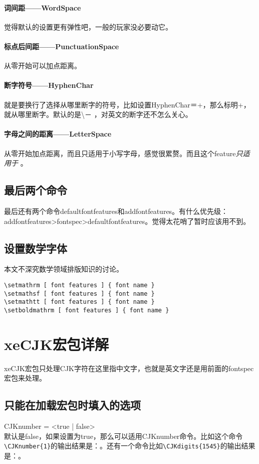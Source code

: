 \paragraph{词间距——WordSpace}
觉得默认的设置更有弹性吧，一般的玩家没必要动它。

\paragraph{标点后间距——PunctuationSpace}
从零开始可以加点距离。

\paragraph{断字符号——HyphenChar}
就是要换行了选择从哪里断字的符号，比如设置HyphenChar＝{+}，那么标明+，就从哪里断字。默认的是\textbackslash － ，对英文的断字还不怎么关心。

\paragraph{字母之间的距离——LetterSpace}
从零开始加点距离，而且只适用于小写字母，感觉很累赘。而且这个feature\emph{只适用于\XeTeX} 。


\subsection{最后两个命令}
最后还有两个命令defaultfontfeatures和addfontfeatures。有什么优先级：\\ addfontfeatures>fontspec>defaultfontfeatures。觉得太花哨了暂时应该用不到。


\subsection{设置数学字体}
本文不深究数学领域排版知识的讨论。
\begin{verbatim}
\setmathrm [ font features ] { font name }
\setmathsf [ font features ] { font name }
\setmathtt [ font features ] { font name }
\setboldmathrm [ font features ] { font name }
\end{verbatim}


\section{xeCJK宏包详解}
xeCJK宏包只处理CJK字符在这里指中文字，也就是英文字还是用前面的fontspec宏包来处理。

\subsection{只能在加载宏包时填入的选项}
CJKnumber = <true | false> \\
默认是false，如果设置为true，那么可以适用CJKnumber命令。比如这个命令\verb+\CJKnumber{1}+的输出结果是：。还有一个命令比如\verb+\CJKdigits{1545}+的输出结果是：。


